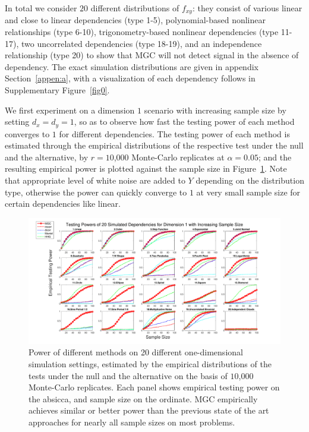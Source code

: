 \documentclass[11pt]{article}
\begin{document}

In total we consider $20$ different distributions of $f_{xy}$: they consist of various linear and close to linear dependencies (type 1-5), polynomial-based nonlinear relationships (type 6-10), trigonometry-based nonlinear dependencies (type 11-17), two uncorrelated dependencies (type 18-19), and an independence relationship (type 20) to show that MGC will not detect signal in the absence of dependency. The exact simulation distributions are given in appendix Section~\ref{appen:a}, with a visualization of each dependency follows in Supplementary Figure~\ref{fig0}.

We first experiment on a dimension $1$ scenario with increasing sample size by setting $d_{x}=d_{y}=1$, so as to observe how fast the testing power of each method converges to $1$ for different dependencies. The testing power of each method is estimated through the empirical distributions of the respective test under the null and the alternative, by $r=10$,$000$ Monte-Carlo replicates at $\alpha=0.05$; and the resulting empirical power is plotted against the sample size in Figure~\ref{fig:1D}. Note that appropriate level of white noise are added to $Y$ depending on the distribution type, otherwise the power can quickly converge to $1$ at very small sample size for certain dependencies like linear.

\begin{figure}[htbp]
\includegraphics[width=1.0\textwidth]{../Figures/Fig1}
\caption{
Power of different methods on 20 different one-dimensional simulation settings, estimated by the empirical distributions of the tests under the null and the alternative on the basis of $10$,$000$ Monte-Carlo replicates.
Each panel shows empirical testing power on the absicca, and sample size on the ordinate.
MGC empirically achieves similar or better power than the previous state of the art approaches for nearly all sample sizes on most problems.}
\label{fig:1D}
\end{figure}
\end{document}
